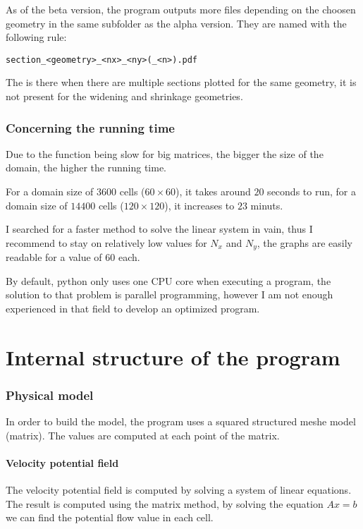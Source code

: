 As of the beta version, the program outputs more files depending on the choosen
geometry in the same subfolder as the alpha version. They are named with the
following rule:
\begin{center}
      \texttt{section_<geometry>_<nx>_<ny>(_<n>).pdf}
\end{center}
The  is there when there are multiple sections plotted for the same
geometry, it is not present for the widening and shrinkage geometries.
\section{Concerning the running time}
Due to the function  being slow for
big matrices, the bigger the size of the domain, the higher the running time.

For a domain size of $\num{3600}$ cells ($\num{60} \times \num{60}$), it takes
around $\num{20}$ seconds to run, for a domain size of $\num{14400}$ cells
($\num{120} \times \num{120}$), it increases to $\num{23}$ minuts. 

I searched for a faster method to solve the linear system in vain, thus I
recommend to stay on relatively low values for $N_x$ and $N_y$, the graphs are
easily readable for a value of $\num{60}$ each.

By default, python only uses one CPU core when executing a program, the
solution to that problem is parallel programming, however I am not enough
experienced in that field to develop an optimized program.

\newpage
\part{Internal structure of the program}
\section{Physical model}
In order to build the model, the program uses a squared structured meshe
model (matrix). The values are computed at each point of the matrix.

\subsection{Velocity potential field}
The velocity potential field is computed by solving a system of linear
equations. The result is computed using the matrix method, by solving the
equation $Ax = b$ we can find the potential flow value in each cell.


